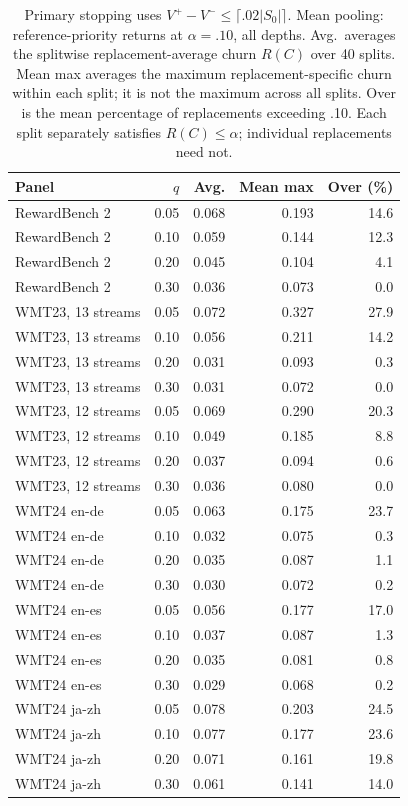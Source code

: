 \begin{table}[t]
\centering\small
\begin{tabular}{lrrrr}
\toprule
Panel & $q$ & Avg. & Mean max & Over (\%) \\
\midrule
RewardBench 2 & 0.05 & 0.068 & 0.193 & 14.6 \\
RewardBench 2 & 0.10 & 0.059 & 0.144 & 12.3 \\
RewardBench 2 & 0.20 & 0.045 & 0.104 & 4.1 \\
RewardBench 2 & 0.30 & 0.036 & 0.073 & 0.0 \\
WMT23, 13 streams & 0.05 & 0.072 & 0.327 & 27.9 \\
WMT23, 13 streams & 0.10 & 0.056 & 0.211 & 14.2 \\
WMT23, 13 streams & 0.20 & 0.031 & 0.093 & 0.3 \\
WMT23, 13 streams & 0.30 & 0.031 & 0.072 & 0.0 \\
WMT23, 12 streams & 0.05 & 0.069 & 0.290 & 20.3 \\
WMT23, 12 streams & 0.10 & 0.049 & 0.185 & 8.8 \\
WMT23, 12 streams & 0.20 & 0.037 & 0.094 & 0.6 \\
WMT23, 12 streams & 0.30 & 0.036 & 0.080 & 0.0 \\
WMT24 en-de & 0.05 & 0.063 & 0.175 & 23.7 \\
WMT24 en-de & 0.10 & 0.032 & 0.075 & 0.3 \\
WMT24 en-de & 0.20 & 0.035 & 0.087 & 1.1 \\
WMT24 en-de & 0.30 & 0.030 & 0.072 & 0.2 \\
WMT24 en-es & 0.05 & 0.056 & 0.177 & 17.0 \\
WMT24 en-es & 0.10 & 0.037 & 0.087 & 1.3 \\
WMT24 en-es & 0.20 & 0.035 & 0.081 & 0.8 \\
WMT24 en-es & 0.30 & 0.029 & 0.068 & 0.2 \\
WMT24 ja-zh & 0.05 & 0.078 & 0.203 & 24.5 \\
WMT24 ja-zh & 0.10 & 0.077 & 0.177 & 23.6 \\
WMT24 ja-zh & 0.20 & 0.071 & 0.161 & 19.8 \\
WMT24 ja-zh & 0.30 & 0.061 & 0.141 & 14.0 \\
\bottomrule
\end{tabular}
\caption{Primary stopping uses $V^+-V^-\le\lceil.02|S_0|\rceil$. Mean pooling: reference-priority returns at $\alpha=.10$, all depths. Avg.\ averages the splitwise replacement-average churn $R(C)$ over 40 splits. Mean max averages the maximum replacement-specific churn within each split; it is not the maximum across all splits. Over is the mean percentage of replacements exceeding .10. Each split separately satisfies $R(C)\le\alpha$; individual replacements need not.}
\label{tab:review-replacement-mean}
\end{table}

